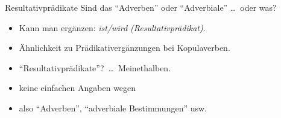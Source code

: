 \begin{frame}
  {Resultativprädikate}
  \pause
  Sind das "`Adverben"' oder "`Adverbiale"' \ldots\ oder was?\\
  \Halbzeile
  \pause
  \begin{exe}
    \ex\label{ex:praedikative027}
    \begin{xlist}
    \end{xlist}
  \end{exe}
  \pause
  \begin{itemize}[<+->]
    \item Kann man ergänzen: \textit{ ist\slash wird \alert{(Resultativprädikat)}}.
      \Halbzeile
    \item Ähnlichkeit zu Prädikativergänzungen bei Kopulaverben.
    \item "`Resultativprädikate"'? \ldots\ Meinethalben.
    \item keine einfachen Angaben wegen 
    \item also  "`Adverben"', "`adverbiale Bestimmungen"' usw.
  \end{itemize}
\end{frame}

